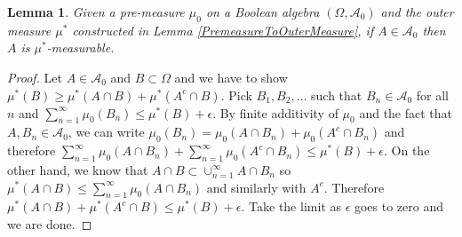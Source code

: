 \documentclass{amsart}
\newtheorem{lem}[thm]{Lemma}
\theoremstyle{remark}
\theoremstyle{definition}
\begin{document}
\begin{lem}\label{PremeasureBooleanAlgebraOuterMeasurable}Given a pre-measure $\mu_0$ on a Boolean algebra $(\Omega,
  \mathcal{A}_0)$ and the outer measure $\mu^*$ constructed in Lemma
  \ref{PremeasureToOuterMeasure}, if $A \in \mathcal{A}_0$ then $A$ is
  $\mu^*$-measurable.
\end{lem}
\begin{proof}
Let $A \in \mathcal{A}_0$ and $B \subset \Omega$ and we have to show
$\mu^*(B) \geq \mu^*(A \cap B) + \mu^*(A^c \cap B)$. 
Pick $B_1, B_2, \dotsc$ such that $B_n \in \mathcal{A}_0$ for all $n$
and $\sum_{n=1}^\infty \mu_0(B_n) \leq \mu^*(B) + \epsilon$.  By
finite additivity of $\mu_0$ and the fact that $A, B_n \in \mathcal{A}_0$,
we can write $\mu_0 (B_n) = \mu_0(A \cap B_n) + \mu_0(A^c \cap B_n)$
and therefore $\sum_{n=1}^\infty \mu_0(A \cap B_n) + \sum_{n=1}^\infty
\mu_0(A^c \cap B_n) \leq \mu^*(B) + \epsilon$.  On the other hand, we
know that $A \cap B \subset \cup_{n=1}^\infty A \cap B_n$ so $\mu^*(A
\cap B) \leq \sum_{n=1}^\infty \mu_0( A \cap B_n)$ and similarly with
$A^c$.  Therefore $\mu^*(A \cap B) + \mu^*(A^c \cap B)\leq \mu^*(B) + \epsilon$.
Take the limit as $\epsilon$ goes to zero and we are done.
\end{proof}
\end{document}
